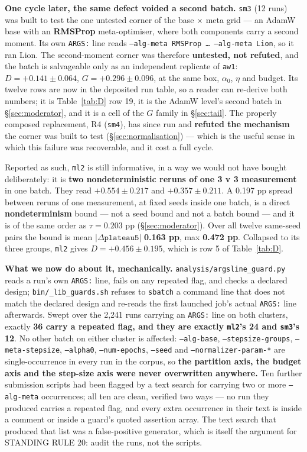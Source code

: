 \documentclass[10pt,letterpaper]{article}
\newcommand{\Dstat}{D}                         %
\newcommand{\Gstat}{G}                         %
\newcommand{\plateau}{\texttt{plateau5}}
\newcommand{\arm}[1]{\texttt{#1}}
\begin{document}
\textbf{One cycle later, the same defect voided a second batch.} \arm{sm3} (12 runs) was built to
test the one untested corner of the base $\times$ meta grid --- an AdamW base with an
\textbf{RMSProp} meta-optimiser, where both components carry a second moment. Its own
\texttt{ARGS:} line reads \texttt{--alg-meta RMSProp \ldots{} --alg-meta Lion}, so it ran Lion.
The second-moment corner was therefore \textbf{untested, not refuted}, and the batch is
salvageable only as
an independent replicate of \arm{aw1}: $\Dstat = +0.141 \pm 0.064$, $\Gstat = +0.296 \pm 0.096$,
at the same box, $\alpha_0$, $\eta$ and budget. Its twelve rows are now in the deposited run
table, so a reader can re-derive both numbers; it is Table~\ref{tab:D} row 19, it is the AdamW
level's second batch in \S\ref{sec:moderator}, and it is a cell of the $\Gstat$ family in
\S\ref{sec:tail}. The properly composed replacement, R4 (\arm{sm4}), has since run and
\textbf{refuted the mechanism} the corner was built to test (\S\ref{sec:normalisation}) --- which
is the useful sense in which this failure was recoverable, and it cost a full cycle.

Reported as such, \arm{ml2} is still informative, in a way we would not have bought deliberately:
it is \textbf{two nondeterministic reruns of one 3 v 3 measurement} in one batch. They read
$\mathbf{+0.554 \pm 0.217}$ and $\mathbf{+0.357 \pm 0.211}$. A 0.197 pp spread between reruns of
one measurement, at fixed seeds inside one batch, is a direct \textbf{nondeterminism} bound ---
not a seed bound and not a batch bound --- and it is of the same order as $\tau = 0.203$ pp
(\S\ref{sec:moderator}). Over all twelve same-seed pairs the bound is mean $|\Delta\plateau|$
\textbf{0.163 pp}, max \textbf{0.472 pp}. Collapsed to its three groups, \arm{ml2} gives
$\Dstat = +0.456 \pm 0.195$, which is row 5 of Table~\ref{tab:D}.

\textbf{What we now do about it, mechanically.} \texttt{analysis/argsline\_guard.py} reads a run's
own \texttt{ARGS:} line, fails on any repeated flag, and checks a declared design;
\texttt{bin/\_lib\_guards.sh} refuses to \texttt{sbatch} a command line that does not match the
declared design and re-reads the first launched job's actual \texttt{ARGS:} line afterwards. Swept
over the 2{,}241 runs carrying an \texttt{ARGS:} line on both clusters, exactly \textbf{36 carry a
repeated flag, and they are exactly \arm{ml2}'s 24 and \arm{sm3}'s 12}. No other batch on either
cluster is affected: \texttt{--alg-base}, \texttt{--stepsize-groups}, \texttt{--meta-stepsize},
\texttt{--alpha0}, \texttt{--num-epochs}, \texttt{--seed} and \texttt{--normalizer-param-*} are
single-occurrence in every run in the corpus, so \textbf{the partition axis, the budget axis and
the step-size axis were never overwritten anywhere.} Ten further submission scripts had been
flagged by a text search for carrying two or more \texttt{--alg-meta} occurrences; all ten are
clean, verified two ways --- no run they produced carries a repeated flag, and every extra
occurrence in their text is inside a comment or inside a guard's quoted assertion array. The text
search that produced that list was a false-positive generator, which is itself the argument for
STANDING RULE 20: audit the runs, not the scripts.
\end{document}
